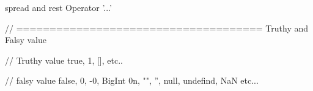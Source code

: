 spread and rest Operator '...' 

// ===================================== 
Truthy and Falsy value

// Truthy value
true, 1, [], {} etc..

// falsy value
false, 0, -0, BigInt 0n, "", '', null, undefind, NaN etc...

